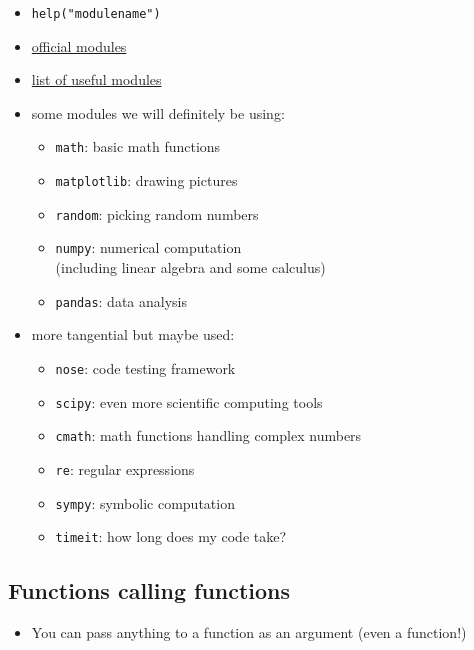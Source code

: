 \documentclass[]{tufte-handout}
\providecommand{\tightlist}{%
  \setlength{\itemsep}{0pt}\setlength{\parskip}{0pt}}
\begin{document}
\begin{itemize}
\tightlist
\item
  \texttt{help("modulename")}
\item
  \href{https://docs.python.org/3/py-modindex.html}{official modules}
\item
  \href{https://wiki.python.org/moin/UsefulModules}{list of useful
  modules}
\item
  some modules we will definitely be using:

  \begin{itemize}
  \tightlist
  \item
    \texttt{math}: basic math functions
  \item
    \texttt{matplotlib}: drawing pictures
  \item
    \texttt{random}: picking random numbers
  \item
    \texttt{numpy}: numerical computation\\
    (including linear algebra and some calculus)
  \item
    \texttt{pandas}: data analysis
  \end{itemize}
\item
  more tangential but maybe used:

  \begin{itemize}
  \tightlist
  \item
    \texttt{nose}: code testing framework
  \item
    \texttt{scipy}: even more scientific computing tools
  \item
    \texttt{cmath}: math functions handling complex numbers
  \item
    \texttt{re}: regular expressions
  \item
    \texttt{sympy}: symbolic computation
  \item
    \texttt{timeit}: how long does my code take?
  \end{itemize}
\end{itemize}

\subsection{Functions calling
functions}\label{functions-calling-functions}

\begin{itemize}
\tightlist
\item
  You can pass anything to a function as an argument (even a function!)
\end{itemize}
\end{document}
